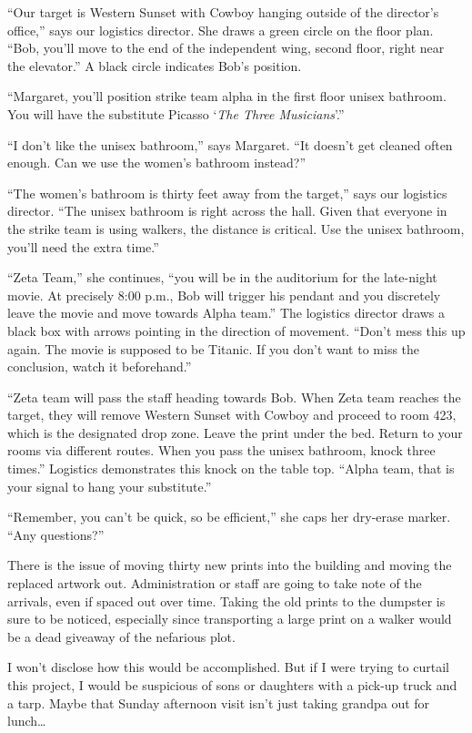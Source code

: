 \documentclass[
  letterpaper,
  DIV=11,
  numbers=noendperiod]{scrreprt}
\begin{document}
``Our target is Western Sunset with Cowboy hanging outside of the
director's office,'' says our logistics director. She draws a green
circle on the floor plan. ``Bob, you'll move to the end of the
independent wing, second floor, right near the elevator.'' A black
circle indicates Bob's position.

``Margaret, you'll position strike team alpha in the first floor unisex
bathroom. You will have the substitute Picasso `\emph{The Three
Musicians}'.''

``I don't like the unisex bathroom,'' says Margaret. ``It doesn't get
cleaned often enough. Can we use the women's bathroom instead?''

``The women's bathroom is thirty feet away from the target,'' says our
logistics director. ``The unisex bathroom is right across the hall.
Given that everyone in the strike team is using walkers, the distance is
critical. Use the unisex bathroom, you'll need the extra time.''

``Zeta Team,'' she continues, ``you will be in the auditorium for the
late-night movie. At precisely 8:00 p.m., Bob will trigger his pendant
and you discretely leave the movie and move towards Alpha team.'' The
logistics director draws a black box with arrows pointing in the
direction of movement. ``Don't mess this up again. The movie is supposed
to be Titanic. If you don't want to miss the conclusion, watch it
beforehand.''

``Zeta team will pass the staff heading towards Bob. When Zeta team
reaches the target, they will remove Western Sunset with Cowboy and
proceed to room 423, which is the designated drop zone. Leave the print
under the bed. Return to your rooms via different routes. When you pass
the unisex bathroom, knock three times.'' Logistics demonstrates this
knock on the table top. ``Alpha team, that is your signal to hang your
substitute.''

``Remember, you can't be quick, so be efficient,'' she caps her
dry-erase marker. ``Any questions?''

There is the issue of moving thirty new prints into the building and
moving the replaced artwork out. Administration or staff are going to
take note of the arrivals, even if spaced out over time. Taking the old
prints to the dumpster is sure to be noticed, especially since
transporting a large print on a walker would be a dead giveaway of the
nefarious plot.

I won't disclose how this would be accomplished. But if I were trying to
curtail this project, I would be suspicious of sons or daughters with a
pick-up truck and a tarp. Maybe that Sunday afternoon visit isn't just
taking grandpa out for lunch\ldots{}
\end{document}
